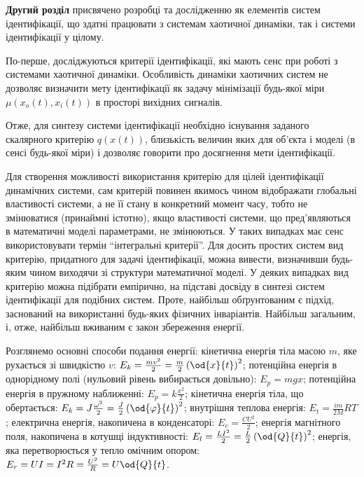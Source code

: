 \documentclass[a4paper,13pt]{atuaref}
\begin{document}
\textbf{Другий розділ}
присвячено розробці та дослідженню як елементів систем ідентифікації,
що здатні працювати з системам хаотичної динаміки, так і системи ідентифікації у цілому.

По-перше, досліджуються критерії ідентифікації,
які мають сенс при роботі з системами
хаотичної динаміки.
Особливість динаміки хаотичних систем не дозволяє визначити мету ідентифікації
як задачу мінімізації будь-якої міри
$\mu (x_o (t), x_i (t))$ в просторі
вихідних сигналів.%

Отже, для синтезу системи ідентифікації необхідно існування заданого скалярного
критерію $q(x(t))$, близькість величин яких для об'єкта і моделі (в сенсі
будь-якої міри) і дозволяє говорити про досягнення мети ідентифікації.

Для створення можливості використання критерію для цілей ідентифікації
динамічних системи, сам критерій повинен якимось чином відображати глобальні
властивості системи, а не її стану в конкретний момент часу, тобто не
змінюватися (принаймні істотно), якщо властивості системи, що пред'являються в
математичні моделі параметрами, не змінюються. У таких випадках має сенс
використовувати термін ``інтегральні критерії''.
Для досить простих систем вид критерію, придатного для задачі ідентифікації,
можна вивести, визначивши будь-яким чином виходячи зі структури математичної
моделі. У деяких випадках вид критерію можна підібрати емпірично, на
підставі досвіду в синтезі систем ідентифікації для подібних систем. Проте,
найбільш обґрунтованим є підхід, заснований на використанні будь-яких фізичних
інваріантів.
Найбільш загальним, і, отже, найбільш вживаним є закон збереження енергії.

Розглянемо основні способи подання енергії:
кінетична енергія тіла масою $m$, яке рухається зі швидкістю $v$:
$E_k = \frac{mv^2}{2} = \frac{m}{2} \left( \od{x}{t} \right)^2$;
потенційна енергія в однорідному полі (нульовий рівень вибирається довільно):
$E_p = m g x$;
потенційна енергія в пружному наближенні:
$E_p = k \frac{x^2}{2}$;
кінетична енергія тіла, що обертається:
$E_k = J \frac{\omega^2}{2} = \frac{J}{2} \left( \od{\varphi}{t} \right)^2$;
внутрішня теплова енергія:
$E_t = \frac{im}{2M} RT$;
електрична енергія, накопичена в конденсаторі:
$E_c = \frac{C U^2}{2}$;
енергія магнітного поля, накопичена в котушці індуктивності:
$E_l = \frac{L I^2}{2} = \frac{L}{2} \left( \od{Q}{t}\right)^2$;
енергія, яка перетворюється у тепло омічним опором:
$E_r = U I = I^2 R = \frac{U^2}{R} = U \od{Q}{t}$.
\end{document}
